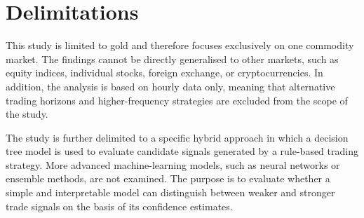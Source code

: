 

\section{Delimitations}


This study is limited to gold and therefore focuses exclusively on one commodity market. The findings cannot be directly generalised to other markets, such as equity indices, individual stocks, foreign exchange, or cryptocurrencies. In addition, the analysis is based on hourly data only, meaning that alternative trading horizons and higher-frequency strategies are excluded from the scope of the study.

The study is further delimited to a specific hybrid approach in which a decision tree model is used to evaluate candidate signals generated by a rule-based trading strategy. More advanced machine-learning models, such as neural networks or ensemble methods, are not examined. The purpose is to evaluate whether a simple and interpretable model can distinguish between weaker and stronger trade signals on the basis of its confidence estimates.
